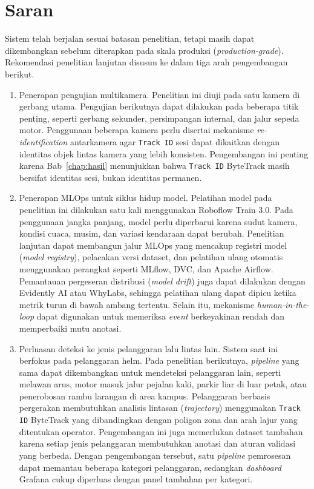 \section{Saran}
\label{sec:saran}

Sistem telah berjalan sesuai batasan penelitian, tetapi masih dapat dikembangkan sebelum diterapkan pada skala produksi (\textit{production-grade}). Rekomendasi penelitian lanjutan disusun ke dalam tiga arah pengembangan berikut.

\begin{enumerate}[1.]
  \item {Penerapan pengujian multikamera.}
    Penelitian ini diuji pada satu kamera di gerbang utama. Pengujian berikutnya dapat dilakukan pada beberapa titik penting, seperti gerbang sekunder, persimpangan internal, dan jalur sepeda motor. Penggunaan beberapa kamera perlu disertai mekanisme \textit{re-identification} antarkamera agar \texttt{Track ID} sesi dapat dikaitkan dengan identitas objek lintas kamera yang lebih konsisten. Pengembangan ini penting karena Bab~\ref{chap:hasil} menunjukkan bahwa \texttt{Track ID} ByteTrack masih bersifat identitas sesi, bukan identitas permanen.

  \item {Penerapan MLOps untuk siklus hidup model.}
    Pelatihan model pada penelitian ini dilakukan satu kali menggunakan Roboflow Train 3.0. Pada penggunaan jangka panjang, model perlu diperbarui karena sudut kamera, kondisi cuaca, musim, dan variasi kendaraan dapat berubah. Penelitian lanjutan dapat membangun jalur MLOps yang mencakup registri model (\textit{model registry}), pelacakan versi dataset, dan pelatihan ulang otomatis menggunakan perangkat seperti MLflow, DVC, dan Apache Airflow. Pemantauan pergeseran distribusi (\textit{model drift}) juga dapat dilakukan dengan Evidently AI atau WhyLabs, sehingga pelatihan ulang dapat dipicu ketika metrik turun di bawah ambang tertentu. Selain itu, mekanisme \textit{human-in-the-loop} dapat digunakan untuk memeriksa \textit{event} berkeyakinan rendah dan memperbaiki mutu anotasi.

  \item {Perluasan deteksi ke jenis pelanggaran lalu lintas lain.}
    Sistem saat ini berfokus pada pelanggaran helm. Pada penelitian berikutnya, \textit{pipeline} yang sama dapat dikembangkan untuk mendeteksi pelanggaran lain, seperti melawan arus, motor masuk jalur pejalan kaki, parkir liar di luar petak, atau penerobosan rambu larangan di area kampus. Pelanggaran berbasis pergerakan membutuhkan analisis lintasan (\textit{trajectory}) menggunakan \texttt{Track ID} ByteTrack yang dibandingkan dengan poligon zona dan arah lajur yang ditentukan operator. Pengembangan ini juga memerlukan dataset tambahan karena setiap jenis pelanggaran membutuhkan anotasi dan aturan validasi yang berbeda. Dengan pengembangan tersebut, satu \textit{pipeline} pemrosesan dapat memantau beberapa kategori pelanggaran, sedangkan \textit{dashboard} Grafana cukup diperluas dengan panel tambahan per kategori.
\end{enumerate}

